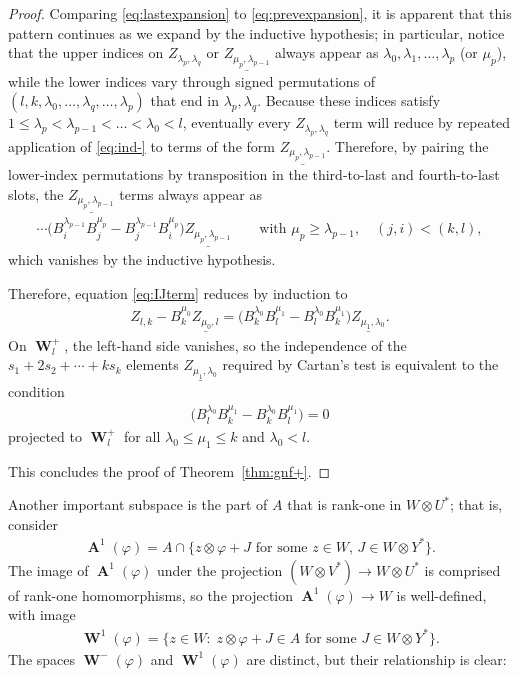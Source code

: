 \documentclass[pdftex]{sigma}
\numberwithin{equation}{section}
\DeclareMathOperator{\Au}{\mathbf{A}}
\DeclareMathOperator{\Wu}{\mathbf{W}}
\begin{document}
\begin{proof}
Comparing \eqref{eq:lastexpansion} to \eqref{eq:prevexpansion}, it is apparent
that this pattern continues as we expand by the inductive hypothesis;
in particular, notice that the upper indices on $Z_{\lambda_{p}, \lambda_{q}}$
or $\underline{Z_{\mu_{p},\lambda_{p-1}}}$
always appear as $\lambda_0, \lambda_1, \ldots, \lambda_p$ (or $\mu_p$), while the lower indices
vary through signed permutations of $(l,k,\lambda_0, \ldots,
\lambda_q, \ldots, \lambda_p)$ that end in  $\lambda_p,\lambda_q$.
Because these indices satisfy $1 \leq \lambda_p < \lambda_{p-1} < \dots < \lambda_0 < l$, eventually
every $Z_{\lambda_p, \lambda_q}$ term will reduce by repeated application of
\eqref{eq:ind-} to terms of the
form $\underline{Z_{\mu_p,\lambda_{p-1}}}$.  Therefore,
by pairing the lower-index permutations by transposition in the third-to-last
and fourth-to-last slots, the $\underline{Z_{\mu_{p},\lambda_{p-1}}}$ terms always appear as
\begin{gather*}
\cdots
\big(B^{\lambda_{p-1}}_iB^{\mu_{p}}_j
- B^{\lambda_{p-1}}_jB^{\mu_{p}}_i\big)\underline{Z_{\mu_{p},\lambda_{p-1}}} \qquad
\text{with $\mu_{p} \geq \lambda_{p-1},\quad (j,i) < (k,l)$},
\end{gather*} which vanishes by the
inductive hypothesis.

Therefore, equation \eqref{eq:IJterm} reduces by induction to
\begin{gather*}
Z_{l,k}  -B_k^{\mu_0} \underline{Z_{\mu_0,l}} =
\big(B_{k}^{\lambda_0}B_{l}^{\mu_1} - B_{l}^{\lambda_0}B_{k}^{\mu_1}\big)
\underline{Z_{\mu_1,\lambda_0}}.
\end{gather*}
On $\Wu^+_l$, the left-hand side vanishes, so the independence of the
$s_1 + 2s_2 + \cdots + k s_k$ elements
$\underline{Z_{\mu_1,\lambda_0}}$ required by Cartan's test is equivalent to
the condition
\begin{gather*}
\big(B_{l}^{\lambda_0}B_{k}^{\mu_1} - B_{k}^{\lambda_0}B_{l}^{\mu_1}\big)
=0
\end{gather*}
projected to $\Wu^+_l$ for all $\lambda_0 \leq \mu_1  \leq k$ and $\lambda_0 < l$.

This concludes the proof of Theorem~\ref{thm:gnf+}.
\end{proof}

Another important subspace is the part of $A$ that is rank-one in $W
\otimes U^*$; that is, consider
\begin{gather*}
\Au^1(\varphi) = A \cap \big\{ z \otimes \varphi  + J
\text{ for some $z \in W$, $J \in W \otimes Y^*$}  \big\}.
\end{gather*}
The image of $\Au^1(\varphi)$ under the projection $(W \otimes V^*)
\to W \otimes U^*$ is comprised of rank-one homomorphisms, so
the projection $\Au^1(\varphi) \to W$ is well-def\/ined, with image
\begin{gather*}
\Wu^1(\varphi) = \big\{ z \in W\colon \; z\otimes \varphi +J \in
A \text{ for some $J \in W \otimes Y^*$} \big\}.
\label{W1e}
\end{gather*}
The spaces $\Wu^-(\varphi)$ and $\Wu^1(\varphi)$ are distinct, but their relationship is clear:
\end{document}
